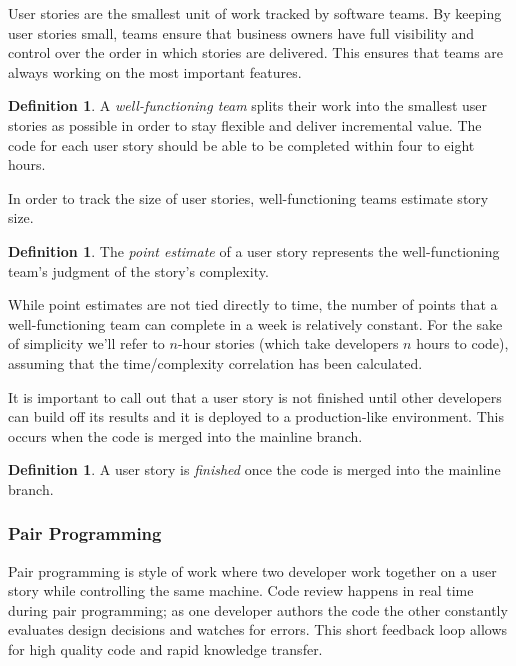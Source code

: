 \documentclass[letterpaper]{article}
\theoremstyle{definition}
\newtheorem{definition}[theorem]{Definition}
\begin{document}
    User stories are the smallest unit of work tracked by software teams.
    By keeping user stories small, teams ensure that business owners have full visibility and control over the order
    in which stories are delivered.
    This ensures that teams are always working on the most important features.

    \begin{definition}
        A \textit{well-functioning team} splits their work into the smallest user stories as possible in order to stay
        flexible and deliver incremental value.
        The code for each user story should be able to be completed within four to eight hours.
    \end{definition}

    In order to track the size of user stories, well-functioning teams estimate story size.

    \begin{definition}
        The \textit{point estimate} of a user story represents the well-functioning team's judgment of the story's
        complexity.
    \end{definition}

    While point estimates are not tied directly to time, the number of points that a well-functioning team can complete
    in a week is relatively constant.
    For the sake of simplicity we'll refer to $n$-hour stories (which take developers $n$ hours to code), assuming that
    the time/complexity correlation has been calculated.

    It is important to call out that a user story is not finished until other developers can build off its results and
    it is deployed to a production-like environment.
    This occurs when the code is merged into the mainline branch.

    \begin{definition}
        A user story is \textit{finished} once the code is merged into the mainline branch.
    \end{definition}

    \subsubsection{Pair Programming}\label{subsubsec:pairing}

    Pair programming is style of work where two developer work together on a user story while controlling the same machine.
    Code review happens in real time during pair programming;
    as one developer authors the code the other constantly evaluates design decisions and watches for errors.
    This short feedback loop allows for high quality code and rapid knowledge transfer.
\end{document}
